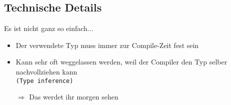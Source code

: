 \subsection{Technische Details}
\begin{frame} %
    \slidehead
    Es ist nicht ganz so einfach...

    \begin{itemize}[<+->]
        \item Der verwendete Typ muss immer zur Compile-Zeit fest sein
        \item Kann sehr oft weggelassen werden, weil der Compiler den Typ selber nachvollziehen kann\\
            \texttt{(Type inference)}
        \item[$\Rightarrow$] Das werdet ihr morgen sehen
    \end{itemize}

\end{frame}




